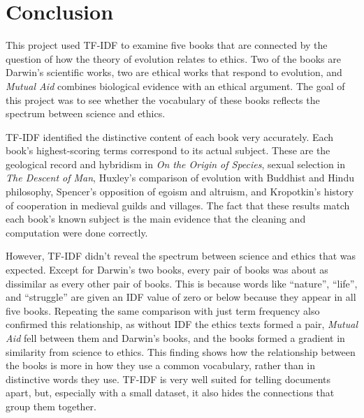 \documentclass[11pt]{article}
\begin{document}
\section{Conclusion}
\label{sec:conclusion}

This project used TF-IDF to examine five books that are connected by the question of how the theory of evolution relates to ethics.
Two of the books are Darwin's scientific works, two are ethical works that respond to evolution, and \emph{Mutual Aid} combines biological evidence with an ethical argument.
The goal of this project was to see whether the vocabulary of these books reflects the spectrum between science and ethics.

TF-IDF identified the distinctive content of each book very accurately.
Each book's highest-scoring terms correspond to its actual subject.
These are the geological record and hybridism in \emph{On the Origin of Species}, sexual selection in \emph{The Descent of Man}, Huxley's comparison of evolution with Buddhist and Hindu philosophy, Spencer's opposition of egoism and altruism, and Kropotkin's history of cooperation in medieval guilds and villages.
The fact that these results match each book's known subject is the main evidence that the cleaning and computation were done correctly.

However, TF-IDF didn't reveal the spectrum between science and ethics that was expected.
Except for Darwin's two books, every pair of books was about as dissimilar as every other pair of books.
This is because words like ``nature'', ``life'', and ``struggle'' are given an IDF value of zero or below because they appear in all five books.
Repeating the same comparison with just term frequency also confirmed this relationship, as without IDF the ethics texts formed a pair, \emph{Mutual Aid} fell between them and Darwin's books, and the books formed a gradient in similarity from science to ethics.
This finding shows how the relationship between the books is more in how they use a common vocabulary, rather than in distinctive words they use.
TF-IDF is very well suited for telling documents apart, but, especially with a small dataset, it also hides the connections that group them together.
\end{document}
